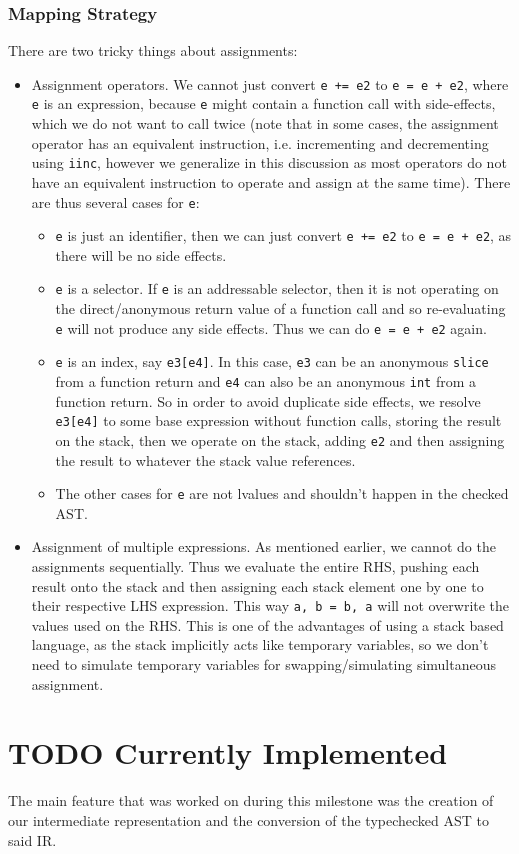 \documentclass[11pt]{article}
\begin{document}
\subsubsection{Mapping Strategy}
\label{sec:orgd95865c}
There are two tricky things about assignments:
\begin{itemize}
\item Assignment operators. We cannot just convert \texttt{e += e2} to \texttt{e =
      e + e2}, where \texttt{e} is an expression, because \texttt{e} might contain a
function call with side-effects, which we do not want to call
twice (note that in some cases, the assignment operator has an
equivalent instruction, i.e. incrementing and decrementing using
\texttt{iinc}, however we generalize in this discussion as most
operators do not have an equivalent instruction to operate and
assign at the same time). There are thus several cases for \texttt{e}:
\begin{itemize}
\item \texttt{e} is just an identifier, then we can just convert \texttt{e += e2}
to \texttt{e = e + e2}, as there will be no side effects.
\item \texttt{e} is a selector. If \texttt{e} is an addressable selector, then it
is not operating on the direct/anonymous return value of a
function call and so re-evaluating \texttt{e} will not produce any
side effects. Thus we can do \texttt{e = e + e2} again.
\item \texttt{e} is an index, say \texttt{e3[e4]}. In this case, \texttt{e3} can be an
anonymous \texttt{slice} from a function return and \texttt{e4} can also be an
anonymous \texttt{int} from a function return. So in order to avoid
duplicate side effects, we resolve \texttt{e3[e4]} to some base
expression without function calls, storing the result on the
stack, then we operate on the stack, adding \texttt{e2} and then
assigning the result to whatever the stack value references.
\item The other cases for \texttt{e} are not lvalues and shouldn't happen
in the checked AST.
\end{itemize}
\item Assignment of multiple expressions. As mentioned earlier, we
cannot do the assignments sequentially. Thus we evaluate the
entire RHS, pushing each result onto the stack and then
assigning each stack element one by one to their respective LHS
expression. This way \texttt{a, b = b, a} will not overwrite the values
used on the RHS. This is one of the advantages of using a stack
based language, as the stack implicitly acts like temporary
variables, so we don't need to simulate temporary variables for
swapping/simulating simultaneous assignment.
\end{itemize}
\section{{\bfseries\sffamily TODO} Currently Implemented}
\label{sec:org91a8fe8}
The main feature that was worked on during this milestone was the
creation of our intermediate representation and the conversion of
the typechecked AST to said IR.
\end{document}
